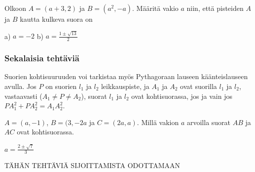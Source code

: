 \begin{tehtavasivu}
\begin {tehtava}
Olkoon $A=(a+3, 2)$ ja $B=(a^2, -a)$. Määritä vakio $a$ niin, että pisteiden $A$ ja $B$ kautta kulkeva suora on
\begin {vastaus}
a) $a=-2$ b) $a=\frac{1\pm\sqrt{13}}{2} $
\end {vastaus}
\end {tehtava}

\subsubsection*{Sekalaisia tehtäviä}

\begin{tehtava}
Suorien kohtisuuruuden voi tarkistaa myös Pythagoraan lauseen käänteislauseen avulla. Jos $P$ on suorien $l_1$ ja $l_2$ leikkauspiste, ja $A_1$ ja $A_2$ ovat suorilla $l_1$ ja $l_2$, vastaavasti ($A_1 \neq P \neq A_2$), suorat $l_1$ ja $l_2$ ovat kohtisuorassa, jos ja vain jos $PA_1^2+PA_2^2 = A_1A_2^2$.
\begin{vastaus}
\end{vastaus}
\end{tehtava}

\begin{tehtava}
$A = (a,-1)$, $B = (3,-2a$ ja $C = (2a,a)$. Millä vakion $a$ arvoilla suorat $AB$ ja $AC$ ovat kohtisuorassa.
\begin{vastaus}
$a = \frac{2\pm \sqrt{7}}{3}$
\end{vastaus}
\end{tehtava}

TÄHÄN TEHTÄVIÄ SIJOITTAMISTA ODOTTAMAAN

\end{tehtavasivu}

